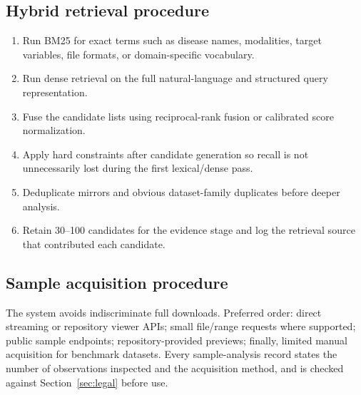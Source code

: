 \documentclass[11pt]{article}
\begin{document}
\subsection{Hybrid retrieval procedure}
\begin{enumerate}[leftmargin=*]
\item Run BM25 for exact terms such as disease names, modalities, target variables, file formats, or
      domain-specific vocabulary.
\item Run dense retrieval on the full natural-language and structured query representation.
\item Fuse the candidate lists using reciprocal-rank fusion or calibrated score normalization.
\item Apply hard constraints after candidate generation so recall is not unnecessarily lost during the
      first lexical/dense pass.
\item Deduplicate mirrors and obvious dataset-family duplicates before deeper analysis.
\item Retain 30--100 candidates for the evidence stage and log the retrieval source that contributed each
      candidate.
\end{enumerate}

\subsection{Sample acquisition procedure}
The system avoids indiscriminate full downloads. Preferred order: direct streaming or repository viewer
APIs; small file/range requests where supported; public sample endpoints; repository-provided previews;
finally, limited manual acquisition for benchmark datasets. Every sample-analysis record states the number
of observations inspected and the acquisition method, and is checked against
Section~\ref{sec:legal} before use.
\end{document}
